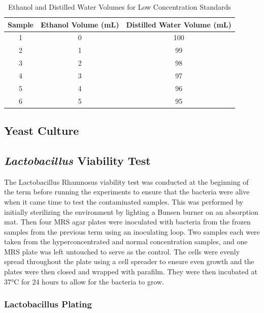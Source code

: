 \documentclass[12pt]{report}
\begin{document}
\begin{table}[!h]
    \centering
    \begin{tabular}{c c c}
    \toprule
    Sample & Ethanol Volume (mL) & Distilled Water Volume (mL) \\
    \midrule
    1 & 0   & 100 \\
    2 & 1  & 99  \\
    3 & 2  & 98  \\
    4 & 3  & 97  \\
    5 & 4 & 96   \\
    6 & 5 & 95   \\
    \bottomrule
    \end{tabular}
    \caption{Ethanol and Distilled Water Volumes for Low Concentration Standards}
    \label{table:ethanol_water_low}
    \end{table}

\subsection{Yeast Culture}

\subsection{\emph{Lactobacillus} Viability Test}

The Lactobacillus Rhamnosus viability test was conducted at the beginning of the term before running the experiments to ensure that the bacteria were alive when it came time to test the contaminated samples. This was performed by initially sterilizing the environment by lighting a Bunsen burner on an absorption mat. Then four MRS agar plates were inoculated with bacteria from the frozen samples from the previous term using an inoculating loop. Two samples each were taken from the hyperconcentrated and normal concentration samples, and one MRS plate was left untouched to serve as the control. The cells were evenly spread throughout the plate using a cell spreader to ensure even growth and the plates were then closed and wrapped with parafilm. They were then incubated at 37°C for 24 hours to allow for the bacteria to grow. 

\subsubsection{Lactobacillus Plating}
\end{document}
